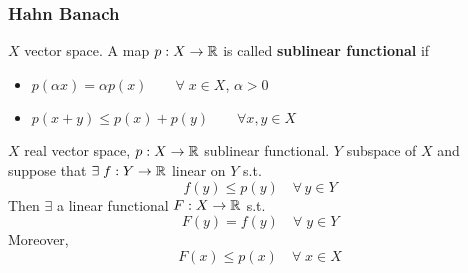 \subsubsection*{Hahn Banach}

\begin{definition}
    \(X\) vector space. A map \(p: X \to \mathbb{R}\) is called \textbf{sublinear functional} if 
    \begin{itemize}
        \item \(p(\alpha x) = \alpha p(x) \qquad \forall \; x \in X\), \(\alpha >0\)
        \item \(p(x+y) \leq p(x) + p(y) \qquad \forall x, y \in X\)  
    \end{itemize}
\end{definition}

\begin{theorem}
    \(X\) real vector space, \(p: X \to \mathbb{R}\) sublinear functional. 
    \(Y\) subspace of \(X\) and suppose that \(\exists \; f: Y \to \mathbb{R} \) linear on \(Y\) s.t. 
    \[
        f(y) \leq p(y) \quad \forall \, y \in Y
    \]
    Then \(\exists\) a linear functional \(F: X \to \mathbb{R} \) s.t. 
    \[
        F(y) = f(y) \quad \forall \; y \in Y \tag*{\(F\) is an extension of \(f\)}
    \]
    Moreover,
    \[
        F(x) \leq p(x) \quad \forall \; x \in X
    \] 
\end{theorem}
